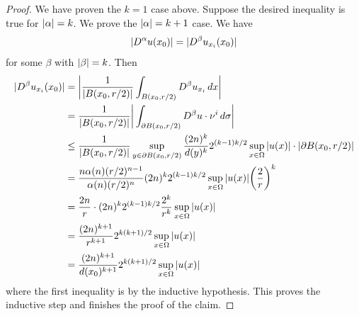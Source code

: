\begin{proof}
We have proven the $k = 1$ case above. Suppose the desired inequality is true for $|\alpha| = k$. We prove the $|\alpha| = k + 1$ case. We have
$$|D^{\alpha}u(x_{0})| = |D^{\beta}u_{x_{i}}(x_{0})|$$
for some $\beta$ with $|\beta| = k$. Then
\begin{align*}
|D^{\beta}u_{x_{i}}(x_{0})| &= \bigg| \frac{1}{|B(x_{0}, r/2)|}\int_{B(x_{0}, r/2)}D^{\beta}u_{x_{i}}\, dx \bigg|\\
&= \frac{1}{|B(x_{0}, r/2)|}\bigg| \int_{\partial B(x_{0}, r/2)}D^{\beta}u \cdot \nu^{i}\, d\sigma \bigg|\\
&\leq \frac{1}{|B(x_{0}, r/2)|}\sup_{y \in \partial B(x_{0}, r/2)}\frac{(2n)^{k}}{d(y)^{k}}2^{(k - 1)k/2}\sup_{x \in \Omega}|u(x)| \cdot |\partial B(x_{0}, r/2)| \\
&= \frac{n\alpha(n)(r/2)^{n - 1}}{\alpha(n)(r/2)^{n}}(2n)^{k}2^{(k - 1)k/2}\sup_{x \in \Omega}|u(x)|\bigg(\frac{2}{r}\bigg)^{k}\\
&= \frac{2n}{r}\cdot (2n)^{k}2^{(k - 1)k/2}\frac{2^{k}}{r^{k}}\sup_{x \in \Omega}|u(x)|\\
&= \frac{(2n)^{k + 1}}{r^{k + 1}}2^{k(k + 1)/2}\sup_{x \in \Omega}|u(x)|\\
&= \frac{(2n)^{k + 1}}{d(x_{0})^{k + 1}}2^{k(k + 1)/2}\sup_{x \in \Omega}|u(x)|
\end{align*}
where the first inequality is by the inductive hypothesis. This proves the
inductive step and finishes the proof of the claim.
\end{proof}

